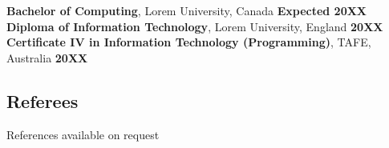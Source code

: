 \documentclass[10pt,a4paper]{article}
\begin{document}
\textbf{Bachelor of Computing}, Lorem University, Canada \hfill \textbf{Expected 20XX}\\
\textbf{Diploma of Information Technology}, Lorem University, England \hfill \textbf{20XX}\\
\textbf{Certificate IV in Information Technology (Programming)}, TAFE, Australia \hfill \textbf{20XX}\\



\subsection*{\textcolor{accent}{\Large Referees  \sout{\hfill}}}
References available on request
\end{document}
